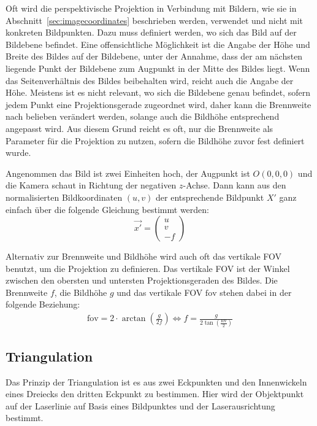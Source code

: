\documentclass[ngerman,a4paper,parskip=half]{scrartcl}
\def \fov{\mathrm{fov}}
\begin{document}
Oft wird die perspektivische Projektion in Verbindung mit Bildern, wie sie in Abschnitt~\ref{sec:imagecoordinates} beschrieben werden, verwendet und nicht mit konkreten Bildpunkten. Dazu muss definiert werden, wo sich das Bild auf der Bildebene befindet. Eine offensichtliche Möglichkeit ist die Angabe der Höhe und Breite des Bildes auf der Bildebene, unter der Annahme, dass der am nächsten liegende Punkt der Bildebene zum Augpunkt in der Mitte des Bildes liegt. Wenn das Seitenverhältnis des Bildes beibehalten wird, reicht auch die Angabe der Höhe. Meistens ist es nicht relevant, wo sich die Bildebene genau befindet, sofern jedem Punkt eine Projektionsgerade zugeordnet wird, daher kann die Brennweite nach belieben verändert werden, solange auch die Bildhöhe entsprechend angepasst wird. Aus diesem Grund reicht es oft, nur die Brennweite als Parameter für die Projektion zu nutzen, sofern die Bildhöhe zuvor fest definiert wurde.

Angenommen das Bild ist zwei Einheiten hoch, der Augpunkt ist $O(0,0,0)$ und die Kamera schaut in Richtung der negativen $z$-Achse. Dann kann aus den normalisierten Bildkoordinaten $(u,v)$ der entsprechende Bildpunkt $X'$ ganz einfach über die folgende Gleichung bestimmt werden:
\[ \vec{x'} = \begin{pmatrix}
u \\ v \\ -f
\end{pmatrix} \]

Alternativ zur Brennweite und Bildhöhe wird auch oft das vertikale \ac{FOV} benutzt, um die Projektion zu definieren. Das vertikale \ac{FOV} ist der Winkel zwischen den obersten und untersten Projektionsgeraden des Bildes. Die Brennweite $f$, die Bildhöhe $g$ und das vertikale \ac{FOV} $\fov$ stehen dabei in der folgende Beziehung:
\begin{align*}
	\fov = 2 \cdot \arctan \left( \frac{g}{2 f} \right)
	\Leftrightarrow f = \frac{g}{2 \tan\left(\frac{\fov}{2}\right)}
\end{align*}

\subsection{Triangulation}

Das Prinzip der Triangulation ist es aus zwei Eckpunkten und den Innenwickeln eines Dreiecks den dritten Eckpunkt zu bestimmen. Hier wird der Objektpunkt auf der Laserlinie auf Basis eines Bildpunktes und der Laserausrichtung bestimmt.
\end{document}

